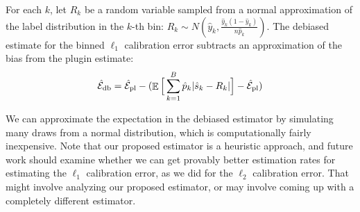 \begin{definition}
For each $k$, let $R_k$ be a random variable sampled from a normal approximation of the label distribution in the $k$-th bin: $R_k \sim N(\hat y_k, \frac{\hat y_k (1 - \hat y_k)}{n \hat{p}_k})$. The debiased estimate for the binned $\ell_1$ calibration error subtracts an approximation of the bias from the plugin estimate:
\[ \hat{\mathcal{E}}_{\textup{db}}{} = \hat{\mathcal{E}}_{\textup{pl}}{} - (\mathop{\mathbb{E}}\Big[\sum_{k=1}^B \hat{p}_k \lvert \hat s_k - R_k \rvert \Big] - \hat{\mathcal{E}}_{\textup{pl}}{}) \]
\end{definition}

We can approximate the expectation in the debiased estimator by simulating many draws from a normal distribution, which is computationally fairly inexpensive. Note that our proposed estimator is a heuristic approach, and future work should examine whether we can get provably better estimation rates for estimating the $\ell_1$ calibration error, as we did for the $\ell_2$ calibration error. That might involve analyzing our proposed estimator, or may involve coming up with a completely different estimator.

